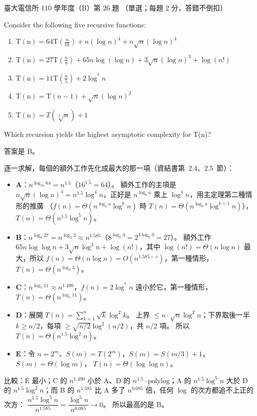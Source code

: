 \begin{pastexam}[label={px:ntu-110-comm-dsa-26}]{臺大電信所 110 學年度（B）第 26 題}
（單選；每題 2 分，答錯不倒扣）

Consider the following five recursive functions:
\begin{enumerate}[label=\Alph*.]
\item $\mathrm{T(n)}=64\mathrm{T}\left(\frac{n}{16}\right)+n(\log n)^4+n\sqrt{n}(\log n)^4$
\item $\mathrm{T(n)}=27\mathrm{T}\left(\frac{n}{8}\right)+65n\log(\log n)+3\sqrt{n}(\log n)^3+\log(n!)$
\item $\mathrm{T(n)}=11\mathrm{T}\left(\frac{n}{5}\right)+2\log^* n$
\item $\mathrm{T(n)}=\mathrm{T}(n-1)+\sqrt{n}(\log n)^2$
\item $\mathrm{T(n)}=T(\sqrt[3]{n})+1$
\end{enumerate}
Which recursion yields the highest asymptotic complexity for T(n)?
\end{pastexam}

\begin{pastsoln}
答案是 B。

逐一求解，每個的額外工作先化成最大的那一項（資結書第~2.4、2.5~節）：
\begin{itemize}
\item \textbf{A}：$n^{\log_{16} 64} = n^{1.5}$（$16^{1.5} = 64$）。 額外工作的主項是
$n\sqrt n(\log n)^4 = n^{1.5}\log^4 n$，正好是 $n^{\log_b a}$ 乘上 $\log^4 n$，用主定理第二種情形的推廣
（$f(n) = \Theta(n^{\log_b a}\log^k n)$ 時 $T(n) = \Theta(n^{\log_b a}\log^{k+1} n)$），
$T(n) = \Theta(n^{1.5}\log^5 n)$。
\item \textbf{B}：$n^{\log_8 27} = n^{\log_2 3} \approx n^{1.585}$（$8^{\log_2 3} = 2^{3\log_2 3} = 27$）。 額外工作
$65n\log\log n + 3\sqrt n\log^3 n + \log(n!)$，其中 $\log(n!) = \Theta(n\log n)$ 最大，所以 $f(n) = \Theta(n\log n)
= O(n^{1.585 - \varepsilon})$，第一種情形，$T(n) = \Theta(n^{\log_2 3})$。
\item \textbf{C}：$n^{\log_5 11} \approx n^{1.490}$，$f(n) = 2\log^* n$ 遠小於它，第一種情形，
$T(n) = \Theta(n^{\log_5 11})$。
\item \textbf{D}：展開 $T(n) = \sum_{k=1}^{n}\sqrt k\log^2 k$。 上界 $\le n \cdot \sqrt n\log^2 n$；下界取後一半
$k \ge n/2$，每項 $\ge \sqrt{n/2}\log^2(n/2)$，共 $n/2$ 項。 所以 $T(n) = \Theta(n^{1.5}\log^2 n)$。
\item \textbf{E}：令 $n = 2^m$、$S(m) = T(2^m)$，$S(m) = S(m/3) + 1$，$S(m) = \Theta(\log m)$，
$T(n) = \Theta(\log\log n)$。
\end{itemize}
比較：E 最小；C 的 $n^{1.490}$ 小於 A、D 的 $n^{1.5}\cdot\text{polylog}$；A 的 $n^{1.5}\log^5 n$ 大於 D 的
$n^{1.5}\log^2 n$；而 B 的 $n^{1.585}$ 比 A 多了 $n^{0.085}$ 倍，任何 $\log$ 的次方都追不上正的次方：
$\dfrac{n^{1.5}\log^5 n}{n^{1.585}} = \dfrac{\log^5 n}{n^{0.085}} \to 0$。 所以最高的是 B。
\end{pastsoln}
